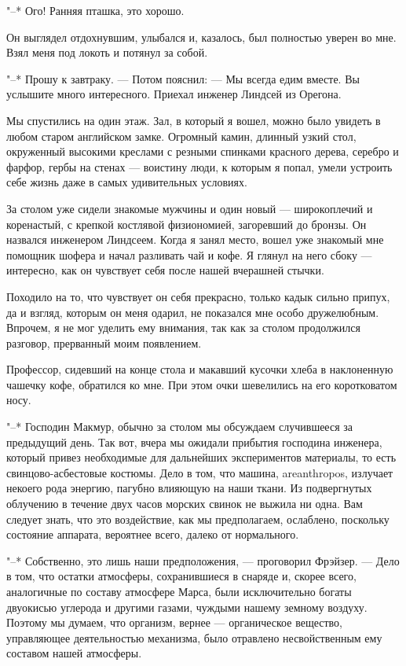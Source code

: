"--* Ого! Ранняя пташка, это хорошо.

Он выглядел отдохнувшим, улыбался и, казалось, был полностью уверен  во
мне. Взял меня под локоть и потянул за собой.

"--* Прошу к завтраку. --- Потом  пояснил:  ---  Мы  всегда  едим  вместе.  Вы
услышите много интересного. Приехал инженер Линдсей из Орегона.

Мы спустились на один этаж. Зал, в который я вошел, можно было  увидеть
в любом старом английском  замке.  Огромный  камин,  длинный  узкий  стол,
окруженный высокими креслами с резными спинками красного дерева, серебро и
фарфор, гербы на стенах --- воистину люди, к которым я попал, умели устроить
себе жизнь даже в самых удивительных условиях.

За столом уже сидели знакомые мужчины и один  новый  ---  широкоплечий  и
коренастый, с крепкой костлявой  физиономией,  загоревший  до  бронзы.  Он
назвался инженером Линдсеем. Когда я занял место, вошел уже  знакомый  мне
помощник шофера и начал разливать чай и кофе. Я глянул  на  него  сбоку  ---
интересно, как он чувствует себя после нашей вчерашней стычки.

Походило на то, что чувствует он себя прекрасно,  только  кадык  сильно
припух, да и взгляд, которым  он  меня  одарил,  не  показался  мне  особо
дружелюбным. Впрочем, я не мог уделить ему внимания,  так  как  за  столом
продолжился разговор, прерванный моим появлением.

Профессор,  сидевший  на  конце  стола  и  макавший  кусочки  хлеба   в
наклоненную чашечку кофе, обратился ко мне. При этом  очки  шевелились  на
его коротковатом носу.

"--* Господин  Макмур,  обычно  за  столом  мы  обсуждаем  случившееся  за
предыдущий день. Так вот, вчера мы ожидали  прибытия  господина  инженера,
который привез необходимые для дальнейших экспериментов материалы, то есть
свинцово-асбестовые  костюмы.  Дело  в  том,  что  машина,   areanthropos,
излучает  некоего  рода  энергию,  пагубно  влияющую  на  наши  ткани.  Из
подвергнутых облучению в течение двух часов морских свинок  не  выжила  ни
одна. Вам  следует  знать,  что  это  воздействие,  как  мы  предполагаем,
ослаблено,  поскольку  состояние  аппарата,  вероятнее  всего,  далеко  от
нормального.

"--* Собственно, это лишь наши предположения, --- проговорил Фрэйзер. --- Дело
в том, что остатки атмосферы, сохранившиеся в  снаряде  и,  скорее  всего,
аналогичные  по  составу  атмосфере  Марса,  были   исключительно   богаты
двуокисью углерода и  другими  газами,  чуждыми  нашему  земному  воздуху.
Поэтому  мы  думаем,  что  организм,  вернее  ---   органическое   вещество,
управляющее деятельностью механизма,  было  отравлено  несвойственным  ему
составом нашей атмосферы.


